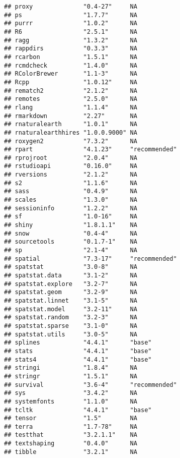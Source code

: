 \documentclass[
]{article}
\begin{document}
\begin{verbatim}
## proxy              "0.4-27"     NA           
## ps                 "1.7.7"      NA           
## purrr              "1.0.2"      NA           
## R6                 "2.5.1"      NA           
## ragg               "1.3.2"      NA           
## rappdirs           "0.3.3"      NA           
## rcarbon            "1.5.1"      NA           
## rcmdcheck          "1.4.0"      NA           
## RColorBrewer       "1.1-3"      NA           
## Rcpp               "1.0.12"     NA           
## rematch2           "2.1.2"      NA           
## remotes            "2.5.0"      NA           
## rlang              "1.1.4"      NA           
## rmarkdown          "2.27"       NA           
## rnaturalearth      "1.0.1"      NA           
## rnaturalearthhires "1.0.0.9000" NA           
## roxygen2           "7.3.2"      NA           
## rpart              "4.1.23"     "recommended"
## rprojroot          "2.0.4"      NA           
## rstudioapi         "0.16.0"     NA           
## rversions          "2.1.2"      NA           
## s2                 "1.1.6"      NA           
## sass               "0.4.9"      NA           
## scales             "1.3.0"      NA           
## sessioninfo        "1.2.2"      NA           
## sf                 "1.0-16"     NA           
## shiny              "1.8.1.1"    NA           
## snow               "0.4-4"      NA           
## sourcetools        "0.1.7-1"    NA           
## sp                 "2.1-4"      NA           
## spatial            "7.3-17"     "recommended"
## spatstat           "3.0-8"      NA           
## spatstat.data      "3.1-2"      NA           
## spatstat.explore   "3.2-7"      NA           
## spatstat.geom      "3.2-9"      NA           
## spatstat.linnet    "3.1-5"      NA           
## spatstat.model     "3.2-11"     NA           
## spatstat.random    "3.2-3"      NA           
## spatstat.sparse    "3.1-0"      NA           
## spatstat.utils     "3.0-5"      NA           
## splines            "4.4.1"      "base"       
## stats              "4.4.1"      "base"       
## stats4             "4.4.1"      "base"       
## stringi            "1.8.4"      NA           
## stringr            "1.5.1"      NA           
## survival           "3.6-4"      "recommended"
## sys                "3.4.2"      NA           
## systemfonts        "1.1.0"      NA           
## tcltk              "4.4.1"      "base"       
## tensor             "1.5"        NA           
## terra              "1.7-78"     NA           
## testthat           "3.2.1.1"    NA           
## textshaping        "0.4.0"      NA           
## tibble             "3.2.1"      NA           

\end{verbatim}
\end{document}
